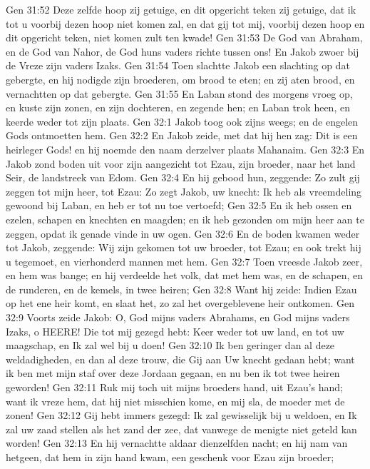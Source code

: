Gen 31:52  Deze zelfde hoop zij getuige, en dit opgericht teken zij getuige, dat ik tot u voorbij dezen hoop niet komen zal, en dat gij tot mij, voorbij dezen hoop en dit opgericht teken, niet komen zult ten kwade!
Gen 31:53  De God van Abraham, en de God van Nahor, de God huns vaders richte tussen ons! En Jakob zwoer bij de Vreze zijn vaders Izaks.
Gen 31:54  Toen slachtte Jakob een slachting op dat gebergte, en hij nodigde zijn broederen, om brood te eten; en zij aten brood, en vernachtten op dat gebergte.
Gen 31:55  En Laban stond des morgens vroeg op, en kuste zijn zonen, en zijn dochteren, en zegende hen; en Laban trok heen, en keerde weder tot zijn plaats.
Gen 32:1  Jakob toog ook zijns weegs; en de engelen Gods ontmoetten hem.
Gen 32:2  En Jakob zeide, met dat hij hen zag: Dit is een heirleger Gods! en hij noemde den naam derzelver plaats Mahanaim.
Gen 32:3  En Jakob zond boden uit voor zijn aangezicht tot Ezau, zijn broeder, naar het land Seir, de landstreek van Edom.
Gen 32:4  En hij gebood hun, zeggende: Zo zult gij zeggen tot mijn heer, tot Ezau: Zo zegt Jakob, uw knecht: Ik heb als vreemdeling gewoond bij Laban, en heb er tot nu toe vertoefd;
Gen 32:5  En ik heb ossen en ezelen, schapen en knechten en maagden; en ik heb gezonden om mijn heer aan te zeggen, opdat ik genade vinde in uw ogen.
Gen 32:6  En de boden kwamen weder tot Jakob, zeggende: Wij zijn gekomen tot uw broeder, tot Ezau; en ook trekt hij u tegemoet, en vierhonderd mannen met hem.
Gen 32:7  Toen vreesde Jakob zeer, en hem was bange; en hij verdeelde het volk, dat met hem was, en de schapen, en de runderen, en de kemels, in twee heiren;
Gen 32:8  Want hij zeide: Indien Ezau op het ene heir komt, en slaat het, zo zal het overgeblevene heir ontkomen.
Gen 32:9  Voorts zeide Jakob: O, God mijns vaders Abrahams, en God mijns vaders Izaks, o HEERE! Die tot mij gezegd hebt: Keer weder tot uw land, en tot uw maagschap, en Ik zal wel bij u doen!
Gen 32:10  Ik ben geringer dan al deze weldadigheden, en dan al deze trouw, die Gij aan Uw knecht gedaan hebt; want ik ben met mijn staf over deze Jordaan gegaan, en nu ben ik tot twee heiren geworden!
Gen 32:11  Ruk mij toch uit mijns broeders hand, uit Ezau's hand; want ik vreze hem, dat hij niet misschien kome, en mij sla, de moeder met de zonen!
Gen 32:12  Gij hebt immers gezegd: Ik zal gewisselijk bij u weldoen, en Ik zal uw zaad stellen als het zand der zee, dat vanwege de menigte niet geteld kan worden!
Gen 32:13  En hij vernachtte aldaar dienzelfden nacht; en hij nam van hetgeen, dat hem in zijn hand kwam, een geschenk voor Ezau zijn broeder;
